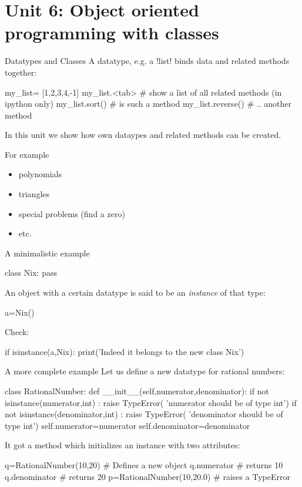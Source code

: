 \documentclass[hyperref={pdfpagelabels=false},table]{beamer}
\begin{document}
\part{Unit 6: Object oriented programming with classes}






\begin{frame}[fragile]{Datatypes and Classes}
A datatype, e.g. a \pyth!list! binds data and related methods
together:

\begin{python}
my_list= [1,2,3,4,-1]
my_list.<tab> #  show a list of all related methods (in ipython only)
my_list.sort()  # is such a method
my_list.reverse() # .. another method
\end{python}

In this unit we show how own dataypes and related methods can be created.

For example
\begin{itemize}
\item polynomials
\item triangles
\item special problems (find a zero)
\item etc.
\end{itemize}
\end{frame}
\begin{frame}[fragile]{A minimalistic example}
\begin{python}
class Nix:
    pass
\end{python}

An object  with a certain datatype is said to be
an \emph{instance} of that type:

\begin{python}
a=Nix()
\end{python}

Check:
\begin{python}
 if isinstance(a,Nix):
    print('Indeed it belongs to the new class Nix')
\end{python}

\end{frame}
\begin{frame}[fragile]{A more complete example}
Let us define a new datatype for rational numbers:
\begin{python}
class RationalNumber:
    def __init__(self,numerator,denominator):
        if not isinstance(numerator,int) :
             raise TypeError(
                   'numerator should be of type int')
        if not isinstance(denominator,int) :
             raise TypeError(
                   'denominator should be of type int')
        self.numerator=numerator
        self.denominator=denominator
\end{python}
\vfill
It got a method which initializes an instance with two attributes:
\vfill
\begin{python}
q=RationalNumber(10,20)    # Defines a new object
q.numerator                # returns 10
q.denominator              # returns 20
p=RationalNumber(10,20.0)  # raises a TypeError
\end{python}

\end{frame}
\end{document}
